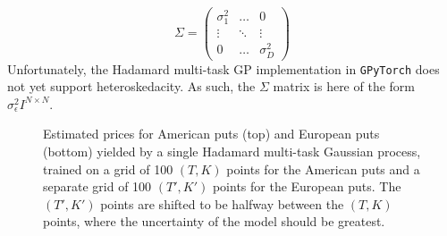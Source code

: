 \documentclass[a4paper,12pt]{article}
\begin{document}
$$
    \Sigma = 
    \begin{pmatrix}
        \sigma_1^2 & \dots & 0 \\
        \vdots & \ddots & \vdots\\
        0 & \dots & \sigma_D^2
    \end{pmatrix}
$$
Unfortunately, the Hadamard multi-task GP implementation in \texttt{GPyTorch} does not yet support heteroskedacity. As such, the $\Sigma$ matrix is here of the form $\sigma_\epsilon^2 I^{N\times N}$.
\begin{figure}[H]
\begin{minipage}[c]{.9\linewidth}
    \centering
\end{minipage} \vfill
\begin{minipage}[c]{.9\linewidth}
    \centering
\end{minipage}
\caption{Estimated prices for American puts (top) and European puts (bottom) yielded by a single Hadamard multi-task Gaussian process, trained on a grid of 100 $(T, K)$ points for the American puts and a separate grid of 100 $(T', K')$ points for the European puts. The $(T', K')$ points are shifted to be halfway between the $(T, K)$ points, where the uncertainty of the model should be greatest.}
\label{fig:mogp_diff_inputs}
\end{figure}
\end{document}
